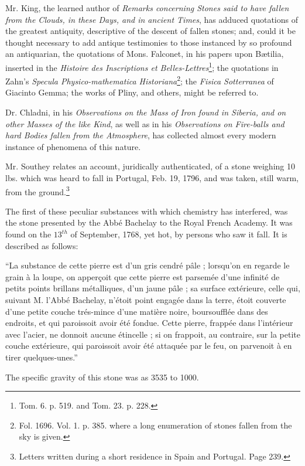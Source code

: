 \documentclass[a4paper, 12pt, oneside, twocolumn]{article}
\begin{document}
Mr. King, the learned author of \emph{Remarks concerning Stones said to have fallen from the Clouds, in these Days, and in ancient Times}, has adduced quotations of the greatest antiquity, descriptive of the descent of fallen stones; and, could it be thought necessary to add antique testimonies to those instanced by so profound an antiquarian, the quotations of Mons. Falconet, in his papers upon Bætilia, inserted in the \emph{Histoire des Inscriptions et Belles-Lettres}\footnote{Tom. 6. p. 519. and Tom. 23. p. 228.}; the quotations in Zahn's \emph{Specula Physico-mathematica Historiana}\footnote{Fol. 1696. Vol. 1. p. 385. where a long enumeration of stones fallen from the sky is given.}; the \emph{Fisica Sotterranea} of Giacinto Gemma; the works of Pliny, and others, might be referred to.

Dr. Chladni, in his \emph{Observations on the Mass of Iron found in Siberia, and on other Masses of the like Kind}, as well as in his \emph{Observations on Fire-balls and hard Bodies fallen from the Atmosphere}, has collected almost every modern instance of phenomena of this nature.

Mr. Southey relates an account, juridically authenticated, of a stone weighing 10 lbs. which was heard to fall in Portugal, Feb. 19, 1796, and was taken, still warm, from the ground.\footnote{Letters written during a short residence in Spain and Portugal. Page 239.}

The first of these peculiar substances with which chemistry has interfered, was the stone presented by the Abbé Bachelay to the Royal French Academy. It was found on the $13^{th}$ of September, 1768, yet hot, by persons who saw it fall. It is described as follows:

``La substance de cette pierre est d'un gris cendré pâle ; lorsqu'on en regarde le grain à la loupe, on apperçoit que cette pierre est parsemée d'une infinité de petits points brillans métalliques, d'un jaune pâle ; sa surface extérieure, celle qui, suivant M. l'Abbé Bachelay, n'étoit point engagée dans la terre, étoit couverte d'une petite couche trés-mince d'une matière noire, boursoufflée dans des endroits, et qui paroissoit avoir été fondue. Cette pierre, frappée dans l'intérieur avec l'acier, ne donnoit aucune étincelle ; si on frappoit, au contraire, sur la petite couche extérieure, qui paroissoit avoir été attaquée par le feu, on parvenoit à en tirer quelques-unes.''

The specific gravity of this stone was as 3535 to 1000.
\end{document}
